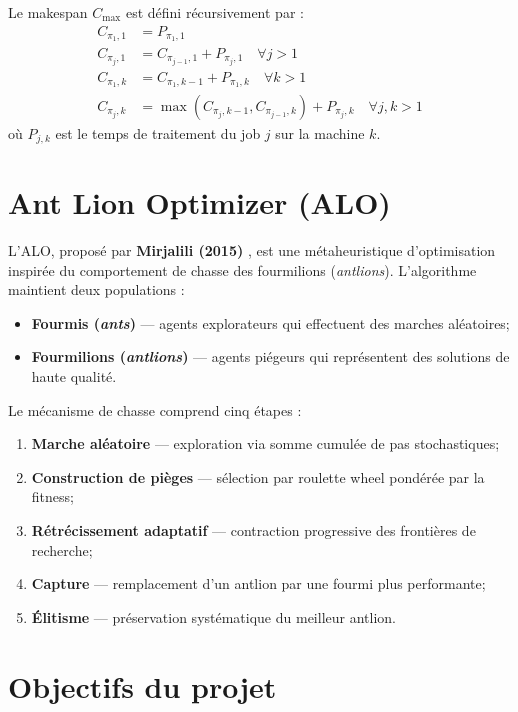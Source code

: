 \documentclass[12pt,a4paper,twoside]{report}
\begin{document}
Le makespan $C_{\max}$ est défini récursivement par :
\begin{align}
    C_{\pi_1,1} &= P_{\pi_1,1} \nonumber \\
    C_{\pi_j,1} &= C_{\pi_{j-1},1} + P_{\pi_j,1} \quad \forall j > 1 \\
    C_{\pi_1,k} &= C_{\pi_1,k-1} + P_{\pi_1,k} \quad \forall k > 1 \nonumber \\
    C_{\pi_j,k} &= \max(C_{\pi_j,k-1}, C_{\pi_{j-1},k}) + P_{\pi_j,k} \quad \forall j,k > 1 \nonumber
\end{align}
où $P_{j,k}$ est le temps de traitement du job $j$ sur la machine $k$.

\section{Ant Lion Optimizer (ALO)}

L'ALO, proposé par \textbf{Mirjalili (2015)} \cite{mirjalili2015}, est une métaheuristique d'optimisation inspirée du comportement de chasse des fourmilions (\textit{antlions}). L'algorithme maintient deux populations :
\begin{itemize}
    \item \textbf{Fourmis (\textit{ants})} --- agents explorateurs qui effectuent des marches aléatoires;
    \item \textbf{Fourmilions (\textit{antlions})} --- agents piégeurs qui représentent des solutions de haute qualité.
\end{itemize}

Le mécanisme de chasse comprend cinq étapes :
\begin{enumerate}
    \item \textbf{Marche aléatoire} --- exploration via somme cumulée de pas stochastiques;
    \item \textbf{Construction de pièges} --- sélection par roulette wheel pondérée par la fitness;
    \item \textbf{Rétrécissement adaptatif} --- contraction progressive des frontières de recherche;
    \item \textbf{Capture} --- remplacement d'un antlion par une fourmi plus performante;
    \item \textbf{Élitisme} --- préservation systématique du meilleur antlion.
\end{enumerate}

\section{Objectifs du projet}
\end{document}
